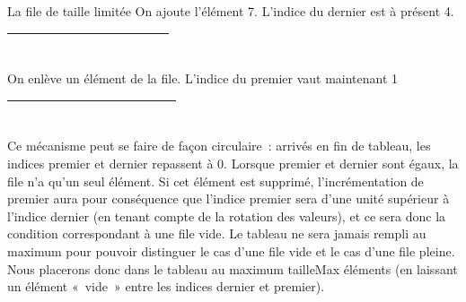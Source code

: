 \begin{Exercice}{La file de taille limitée}
		On ajoute l'élément 7. L'indice du dernier est à présent 4.

		\begin{center}
			\tablefirsthead{}
			\tablehead{}
			\tabletail{}
			\tablelasttail{}
			\begin{supertabular}{|m{1.171cm}|m{1.206cm}|m{1.206cm}|m{1.206cm}|m{1.206cm}|m{1.206cm}|m{1.206cm}|m{1.206cm}|m{1.206cm}|m{1.232cm}|}
			\hline
			 &
			 &
			 &
			 &
			 &
			~
			 &
			~
			 &
			~
			 &
			~
			 &
			~
			\\\hline
			\end{supertabular}
		\end{center}
		
		On enlève un élément de la file. L'indice du premier vaut maintenant 1

		\begin{center}
			\tablefirsthead{}
			\tablehead{}
			\tabletail{}
			\tablelasttail{}
			\begin{supertabular}{|m{1.171cm}|m{1.206cm}|m{1.206cm}|m{1.206cm}|m{1.206cm}|m{1.206cm}|m{1.206cm}|m{1.206cm}|m{1.206cm}|m{1.232cm}|}
			\hline
			~
			 &
			 &
			 &
			 &
			 &
			~
			 &
			~
			 &
			~
			 &
			~
			 &
			~
			\\\hline
			\end{supertabular}
		\end{center}
		
		Ce mécanisme peut se faire de façon circulaire~: arrivés en fin 
		de tableau, les indices premier et dernier repassent à
		0. Lorsque premier et dernier sont égaux, la file n'a qu'un 
		seul élément. Si cet élément est supprimé, l'incrémentation
		de premier aura pour conséquence que l'indice premier sera 
		d'une unité supérieur à l'indice dernier (en tenant compte
		de la rotation des valeurs), et ce sera donc la condition 
		correspondant à une file vide. Le tableau ne sera jamais
		rempli au maximum pour pouvoir distinguer le cas d'une file 
		vide et le cas d'une file pleine. Nous placerons donc dans
		le tableau au maximum tailleMax éléments (en laissant un 
		élément «~vide~» entre les indices dernier et premier).
	\end{Exercice}
	
